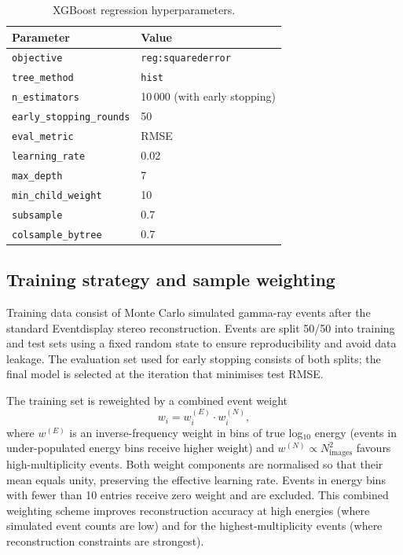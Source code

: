 \documentclass[12pt]{article}
\begin{document}
\begin{table}[h]
\centering
\caption{XGBoost regression hyperparameters.}
\label{tab:hyperparameters}
\begin{tabular}{ll}
\toprule
\textbf{Parameter} & \textbf{Value} \\
\midrule
\texttt{objective}           & \texttt{reg:squarederror} \\
\texttt{tree\_method}        & \texttt{hist} \\
\texttt{n\_estimators}       & 10\,000 (with early stopping) \\
\texttt{early\_stopping\_rounds} & 50 \\
\texttt{eval\_metric}        & RMSE \\
\texttt{learning\_rate}      & 0.02 \\
\texttt{max\_depth}          & 7 \\
\texttt{min\_child\_weight}  & 10 \\
\texttt{subsample}           & 0.7 \\
\texttt{colsample\_bytree}   & 0.7 \\
\bottomrule
\end{tabular}
\end{table}

\subsection{Training strategy and sample weighting}
\label{sec:training}

Training data consist of Monte Carlo simulated gamma-ray events after the standard
Eventdisplay stereo reconstruction.
Events are split 50/50 into training and test sets using a fixed random state
to ensure reproducibility and avoid data leakage.
The evaluation set used for early stopping consists of both splits;
the final model is selected at the iteration that minimises test RMSE.

The training set is reweighted by a combined event weight
\begin{equation}
  w_i = w_i^{(E)} \cdot w_i^{(N)},
\end{equation}
where $w^{(E)}$ is an inverse-frequency weight in bins of true log$_{10}$ energy
(events in under-populated energy bins receive higher weight)
and $w^{(N)} \propto N_\mathrm{images}^2$ favours high-multiplicity events.
Both weight components are normalised so that their mean equals unity,
preserving the effective learning rate.
Events in energy bins with fewer than 10 entries receive zero weight and are excluded.
This combined weighting scheme improves reconstruction accuracy at high energies
(where simulated event counts are low) and for the highest-multiplicity events
(where reconstruction constraints are strongest).
\end{document}
